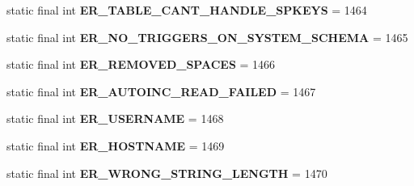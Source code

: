 \begin{DoxyCompactItemize}
\mbox{\label{classcom_1_1mysql_1_1jdbc_1_1_mysql_error_numbers_ad7d5ff4ceceac0476d4af2a5af3adc06}} 
static final int {\bfseries E\+R\+\_\+\+T\+A\+B\+L\+E\+\_\+\+C\+A\+N\+T\+\_\+\+H\+A\+N\+D\+L\+E\+\_\+\+S\+P\+K\+E\+YS} = 1464
\item 
\mbox{\label{classcom_1_1mysql_1_1jdbc_1_1_mysql_error_numbers_aee5a2919fd7eb5ce11575a02cd677692}} 
static final int {\bfseries E\+R\+\_\+\+N\+O\+\_\+\+T\+R\+I\+G\+G\+E\+R\+S\+\_\+\+O\+N\+\_\+\+S\+Y\+S\+T\+E\+M\+\_\+\+S\+C\+H\+E\+MA} = 1465
\item 
\mbox{\label{classcom_1_1mysql_1_1jdbc_1_1_mysql_error_numbers_a7b3bc13d8aeec56771a7b569d2c2eb28}} 
static final int {\bfseries E\+R\+\_\+\+R\+E\+M\+O\+V\+E\+D\+\_\+\+S\+P\+A\+C\+ES} = 1466
\item 
\mbox{\label{classcom_1_1mysql_1_1jdbc_1_1_mysql_error_numbers_a14d0b4998529d02d02c8930549b4239c}} 
static final int {\bfseries E\+R\+\_\+\+A\+U\+T\+O\+I\+N\+C\+\_\+\+R\+E\+A\+D\+\_\+\+F\+A\+I\+L\+ED} = 1467
\item 
\mbox{\label{classcom_1_1mysql_1_1jdbc_1_1_mysql_error_numbers_aec202a2b20ed04040db9f607d10ba5bc}} 
static final int {\bfseries E\+R\+\_\+\+U\+S\+E\+R\+N\+A\+ME} = 1468
\item 
\mbox{\label{classcom_1_1mysql_1_1jdbc_1_1_mysql_error_numbers_a38ecdff5202c791ea0b4553e289de4c1}} 
static final int {\bfseries E\+R\+\_\+\+H\+O\+S\+T\+N\+A\+ME} = 1469
\item 
\mbox{\label{classcom_1_1mysql_1_1jdbc_1_1_mysql_error_numbers_a5529fb3c6e7ed90b7722b26656f95000}} 
static final int {\bfseries E\+R\+\_\+\+W\+R\+O\+N\+G\+\_\+\+S\+T\+R\+I\+N\+G\+\_\+\+L\+E\+N\+G\+TH} = 1470
\item 
\mbox{\label{classcom_1_1mysql_1_1jdbc_1_1_mysql_error_numbers_a67309cabd1e41ce3ac7b5fd6b7b38d76}} 

\end{DoxyCompactItemize}
